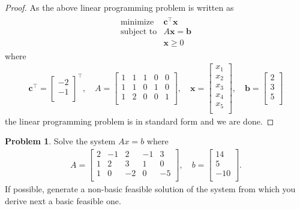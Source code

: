 \documentclass[12pt]{article}
\theoremstyle{definition}
\newtheorem{problem}{Problem}
\newcommand{\vect}[1]{\boldsymbol{#1}}
\begin{document}
\begin{proof}
  As the above linear programming problem is written as
  \begin{align*}
    \begin{array}{rl}
      \text{minimize} & \vect{c}^\intercal \vect{x}\\
      \text{subject to} & A\vect{x} = \vect{b} \\
      & \vect{x} \geq 0
    \end{array}
  \end{align*}
  where
  \begin{align*}
    \vect{c}^\intercal =
    \begin{bmatrix}
      -2 \\
      -1 \\
    \end{bmatrix}^\intercal,
    \quad
    A =
    \begin{bmatrix}
      1 & 1 & 1 & 0 & 0 \\
      1 & 1 & 0 & 1 & 0 \\
      1 & 2 & 0 & 0 & 1 \\
    \end{bmatrix},\quad
    \vect{x} =
    \begin{bmatrix}
      x_1 \\
      x_2 \\
      x_3 \\
      x_4 \\
      x_5 \\
    \end{bmatrix}, \quad
    \vect{b} =
    \begin{bmatrix}
      2 \\
      3 \\
      5 \\
    \end{bmatrix}
  \end{align*}
  the linear programming problem is in standard form and we are done.
\end{proof}
\newpage


\begin{problem}
  Solve the system $Ax = b$ where
  \begin{align*}
    A =
    \begin{bmatrix}
      2 & -1 & 2 & -1 & 3 \\
      1 & 2 & 3 & 1 & 0 \\
      1 & 0 & -2 & 0 & -5 \\
    \end{bmatrix}
    , \quad
    b = \begin{bmatrix}
      14 \\
      5 \\
      -10 \\
    \end{bmatrix}.
  \end{align*}
  If possible, generate a non-basic feasible solution of the system from which
  you derive next a basic feasible one.
\end{problem}
\end{document}
